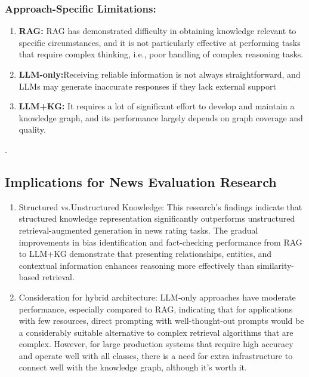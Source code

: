 \documentclass[11pt]{article}
\begin{document}
 \subsubsection{Approach-Specific Limitations:}
\begin{enumerate}

\item \textbf{RAG:} RAG has demonstrated difficulty in obtaining knowledge relevant to specific circumstances, and it is not particularly effective at performing tasks that require complex thinking, i.e., poor handling of complex reasoning tasks.

\item \textbf{LLM-only:}Receiving reliable information is not always straightforward, and LLMs may generate inaccurate responses if they lack external support

\item \textbf{LLM+KG:} It requires a lot of significant effort to develop and maintain a knowledge graph, and its performance largely depends on graph coverage and quality.



\end{enumerate}
.

\subsection{Implications for News Evaluation Research}
\begin{enumerate}
    \item {Structured vs.Unstructured Knowledge:} This research's findings indicate that structured knowledge representation significantly outperforms unstructured retrieval-augmented generation in news rating tasks.  The gradual improvements in bias identification and fact-checking performance from RAG to LLM+KG demonstrate that presenting relationships, entities, and contextual information enhances reasoning more effectively than similarity-based retrieval.
    \item {Consideration for hybrid architecture:}
    LLM-only approaches have moderate performance, especially compared to RAG, indicating that for applications with few resources, direct prompting with well-thought-out prompts would be a considerably suitable alternative to complex retrieval algorithms that are complex.  However, for large production systems that require high accuracy and operate well with all classes, there is a need for extra infrastructure to connect well with the knowledge graph, although it's worth it.

\end{enumerate}
\end{document}
